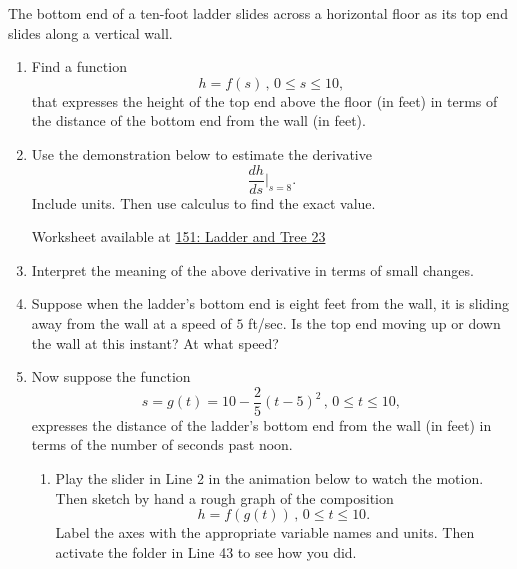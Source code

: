 \documentclass{ximera}
\begin{document}
\begin{question}  \label{QPERdgfret}
The bottom end of a ten-foot ladder slides across a horizontal floor as its top end slides along a vertical wall.

\begin{enumerate}
\item Find a function
\[
   h = f(s) \, , \, 0\leq s \leq 10 ,
\]
that expresses the height of the top end above the floor (in feet) in terms of the distance of the bottom end from the wall (in feet).

\item Use the demonstration below to estimate the derivative
\[
    \frac{dh}{ds}\Big|_{s=8}.
\]
Include units. Then use calculus to find the exact value.

\begin{onlineOnly}
    \begin{center}
\end{center}
\end{onlineOnly}

Worksheet available at \href{https://www.desmos.com/calculator/jqwsnh33o1}{151: Ladder and Tree 23} 

\item Interpret the meaning of the above derivative in terms of small changes.

\item Suppose when the ladder's bottom end is eight feet from the wall, it is sliding away from the wall at a speed of $5$ ft/sec. Is the top end moving up or down the wall at this instant? At what speed?

\item Now suppose the function
\[
    s = g(t)= 10-\frac{2}{5}(t-5)^2\, , \, 0\leq t \leq 10 ,
\]
expresses the distance of the ladder's bottom end from the wall (in feet) in terms of the number of seconds past noon.

\begin{enumerate}
\item Play the slider in Line 2 in the animation below to watch the motion. Then sketch by hand a rough graph of the composition
\[
     h = f(g(t)) \, , \, 0\leq t \leq 10.
\]
Label the axes with the appropriate variable names and units. Then activate the folder in Line 43 to see how you did.

\begin{onlineOnly}
    \begin{center}
\end{center}
\end{onlineOnly}


\end{enumerate}
\end{enumerate}
\end{question}
\end{document}

